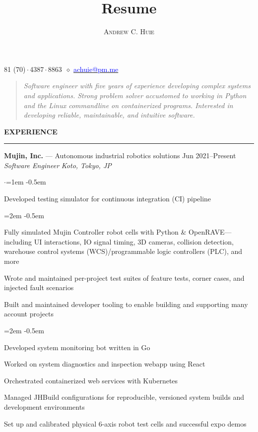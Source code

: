 \documentclass[10pt, a4paper]{article}
\makeatletter
\newenvironment{aSection}[1]{
    \medskip \textbf{\uppercase{#1}}
    \smallskip
    \hrule
    \begin{list}{}{
            \setlength{\leftmargin}{1.5em}
        }
    \item[]
    }{
    \end{list}
}
\newenvironment{expSubsection}[4]{
    {#1} \hfill {#2} \\
    \textit{#3} \hfill \textit{#4}
    \smallskip
    \begin{list}{$\cdot$}{\leftmargin=1em}
    \itemsep -0.5em \vspace{-0.5em}
    }{
    \end{list}
    \vspace{0.5em}
}
\newenvironment{subList}{
    \begin{list}{\raisebox{.4ex}{\tiny$\succ$}}{\leftmargin=2em}
    \itemsep -0.5em \vspace{-0.5em}
    }{
    \end{list}
}
\renewcommand{\maketitle}{
    \begin{center}
        {\Huge\theauthor}

        \vspace{0.25em}

        \raisebox{.3ex}{\footnotesize+}81 (70)\,$\cdot$\,4387\,$\cdot$\,8863~$\diamond$
        \href{mailto:achuie@pm.me}{\textcolor{blue}{
            achuie@pm.me
        }}
    \end{center}

    \vspace{1em}

    \begingroup
    \addtolength\leftmargini{1.5em}
    \begin{quote}
        \textit{Software engineer with five years of experience developing complex systems and
            applications. Strong problem solver accustomed to working in Python and the Linux
            commandline on containerized programs. Interested in developing reliable, maintainable,
            and intuitive software.}
    \end{quote}
    \endgroup
}
\makeatother
\begin{document}
\title{Resume}
\author{\textsc{Andrew C. Huie}}

\maketitle

\begin{aSection}{Experience}
    \begin{expSubsection}
        {\textbf{Mujin, Inc.} --- Autonomous industrial robotics solutions}
        {Jun 2021--Present}
        {Software Engineer}
        {Koto, Tokyo, JP}
    \item Developed testing simulator for continuous integration (CI) pipeline
        \begin{subList}
            \item Fully simulated Mujin Controller robot cells with Python \& OpenRAVE---including UI interactions, IO
                signal timing, 3D cameras, collision detection, warehouse control systems (WCS)/programmable logic
                controllers (PLC), and more
            \item Wrote and maintained per-project test suites of feature tests, corner cases, and injected fault
                scenarios
        \end{subList}
    \item Built and maintained developer tooling to enable building and supporting many account projects
        \begin{subList}
            \item Developed system monitoring bot written in Go
            \item Worked on system diagnostics and inspection webapp using React
            \item Orchestrated containerized web services with Kubernetes
            \item Managed JHBuild configurations for reproducible, versioned system builds and development environments
        \end{subList}
    \item Set up and calibrated physical 6-axis robot test cells and successful expo demos
    \end{expSubsection}


\end{aSection}
\end{document}
